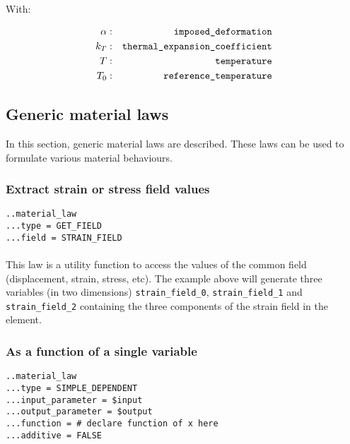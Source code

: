 \documentclass[10pt]{article}
\begin{document}
With:

\begin{eqnarray}
	\alpha & : & \verb+imposed_deformation+ \notag \\
	k_T & : & \verb+thermal_expansion_coefficient+\notag  \\
	T & : & \verb+temperature+ \notag \\
	T_0 & : & \verb+reference_temperature+ \notag 
\end{eqnarray}


\subsection{Generic material laws}

In this section, generic material laws are described. These laws can be used to formulate various material behaviours.


\subsubsection{Extract strain or stress field values}

\noindent \verb+..material_law+\\
\verb+...type = GET_FIELD+\\
\verb+...field = STRAIN_FIELD+

\paragraph{}This law is a utility function to access the values of the common field (displacement, strain, stress, etc). The example above will generate three variables (in two dimensions) \verb+strain_field_0+, \verb+strain_field_1+ and \verb+strain_field_2+ containing the three components of the strain field in the element.


\subsubsection{As a function of a single variable}

\noindent \verb+..material_law+\\
\verb+...type = SIMPLE_DEPENDENT+\\
\verb+...input_parameter = $input+\\
\verb+...output_parameter = $output+\\
\verb+...function = # declare function of x here+\\
\verb+...additive = FALSE+
\end{document}
